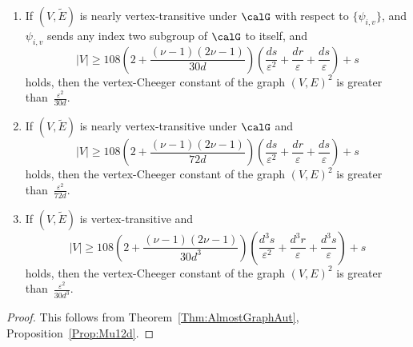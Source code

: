 \begin{theorem}\label{Thm:SpannSubgraVertexTra}
\quad
\begin{enumerate}
\item 
If $(V, \widetilde E)$ is nearly vertex-transitive under $\calG$ with respect to $\{\psi_{i,v}\}$, and $\psi_{i, v}$ sends any index two subgroup of $\calG$ to itself, and 
$$
|V| 
 \geq 
108
\left( 2 + \frac {(\nu-1)(2\nu -1)} {30d}  \right)  
\left( \frac{ds}{\varepsilon^2} + \frac{dr}\varepsilon +\frac{ds}{\varepsilon}\right) + s 
$$
holds, 
then the vertex-Cheeger constant of the graph $(V, E)^2$ is greater than~$\frac{\varepsilon^{2}}{30d}$. 

\item 
If $(V, \widetilde E)$ is nearly vertex-transitive under $\calG$ and 
$$
|V| 
 \geq 
108
\left( 2 + \frac {(\nu-1)(2\nu -1)}  {72d} \right)  
\left( \frac{ds}{\varepsilon^2} + \frac{dr}\varepsilon +\frac{ds}{\varepsilon}\right) + s 
$$
holds, then the vertex-Cheeger constant of the graph $(V, E)^2$ is greater than~$\frac{\varepsilon^{2}}{72d}$. 
\item 
If $(V, \widetilde E)$ is vertex-transitive and 
$$
|V| 
 \geq 
108
\left( 2 + \frac {(\nu-1)(2\nu -1)}  {30d^3} \right)  
\left( \frac{d^3s}{\varepsilon^2} + \frac{d^3r}\varepsilon+ \frac{d^{3}s}{\varepsilon}\right) + s
$$
holds, then the vertex-Cheeger constant of the graph $(V, E)^2$ is greater than~$ \frac{\varepsilon^{2}}{30d^3}$. 
\end{enumerate}
\end{theorem}

\begin{proof}
This follows from Theorem~\ref{Thm:AlmostGraphAut}, Proposition~\ref{Prop:Mu12d}. 
\end{proof}
